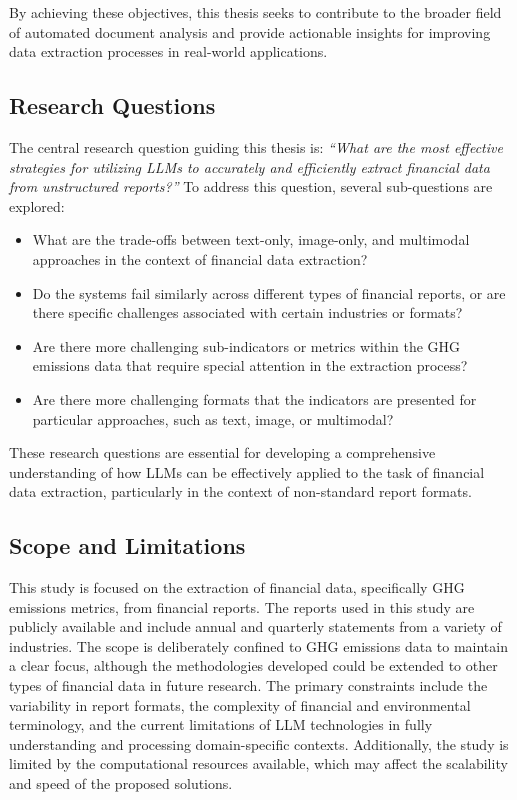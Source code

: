 \documentclass[english, 12pt, a4paper, elec, utf8, a-2b, online]{aaltothesis}
\begin{document}
By achieving these objectives, this thesis seeks to contribute to the broader field of automated document analysis and provide actionable insights for improving data extraction processes in real-world applications.

\subsection{Research Questions}

The central research question guiding this thesis is: \textit{``What are the most effective strategies for utilizing \acp{LLM} to accurately and efficiently extract financial data from unstructured reports?''} To address this question, several sub-questions are explored:
\begin{itemize}
    \item What are the trade-offs between text-only, image-only, and multimodal approaches in the context of financial data extraction?
    \item Do the systems fail similarly across different types of financial reports, or are there specific challenges associated with certain industries or formats?
    \item Are there more challenging sub-indicators or metrics within the \ac{GHG} emissions data that require special attention in the extraction process?
    \item Are there more challenging formats that the indicators are presented for particular approaches, such as text, image, or multimodal?
\end{itemize}

These research questions are essential for developing a comprehensive understanding of how \acp{LLM} can be effectively applied to the task of financial data extraction, particularly in the context of non-standard report formats.

\subsection{Scope and Limitations}

This study is focused on the extraction of financial data, specifically \ac{GHG} emissions metrics, from financial reports.
The reports used in this study are publicly available and include annual and quarterly statements from a variety of industries.
The scope is deliberately confined to \ac{GHG} emissions data to maintain a clear focus, although the methodologies developed could be extended to other types of financial data in future research.
The primary constraints include the variability in report formats, the complexity of financial and environmental terminology, and the current limitations of \ac{LLM} technologies in fully understanding and processing domain-specific contexts.
Additionally, the study is limited by the computational resources available, which may affect the scalability and speed of the proposed solutions.
\end{document}

